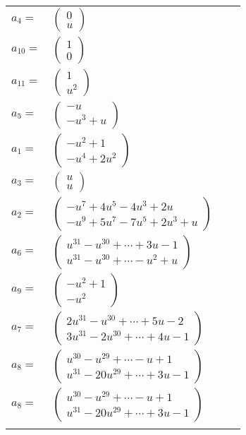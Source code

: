 \documentclass[1p]{elsarticle_modified}
\theoremstyle{definition}
\begin{document}
\begin{tabular}{m{7pt} m{180pt} m{7pt} m{180pt} }
\flushright $a_{4}=$&$\begin{pmatrix}0\\u\end{pmatrix}$ \\
\flushright $a_{10}=$&$\begin{pmatrix}1\\0\end{pmatrix}$ \\
\flushright $a_{11}=$&$\begin{pmatrix}1\\u^2\end{pmatrix}$ \\
\flushright $a_{5}=$&$\begin{pmatrix}- u\\- u^3+u\end{pmatrix}$ \\
\flushright $a_{1}=$&$\begin{pmatrix}- u^2+1\\- u^4+2 u^2\end{pmatrix}$ \\
\flushright $a_{3}=$&$\begin{pmatrix}u\\u\end{pmatrix}$ \\
\flushright $a_{2}=$&$\begin{pmatrix}- u^7+4 u^5-4 u^3+2 u\\- u^9+5 u^7-7 u^5+2 u^3+u\end{pmatrix}$ \\
\flushright $a_{6}=$&$\begin{pmatrix}u^{31}- u^{30}+\cdots+3 u-1\\u^{31}- u^{30}+\cdots- u^2+u\end{pmatrix}$ \\
\flushright $a_{9}=$&$\begin{pmatrix}- u^2+1\\- u^2\end{pmatrix}$ \\
\flushright $a_{7}=$&$\begin{pmatrix}2 u^{31}- u^{30}+\cdots+5 u-2\\3 u^{31}-2 u^{30}+\cdots+4 u-1\end{pmatrix}$ \\
\flushright $a_{8}=$&$\begin{pmatrix}u^{30}- u^{29}+\cdots- u+1\\u^{31}-20 u^{29}+\cdots+3 u-1\end{pmatrix}$\\ \flushright $a_{8}=$&$\begin{pmatrix}u^{30}- u^{29}+\cdots- u+1\\u^{31}-20 u^{29}+\cdots+3 u-1\end{pmatrix}$\\&\end{tabular}
\end{document}
